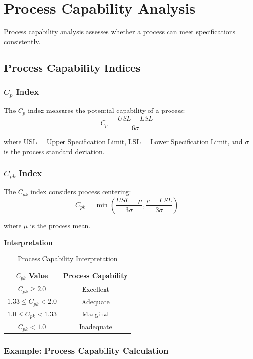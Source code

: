 \documentclass[twoside]{book}
\begin{document}
\section{Process Capability Analysis}

Process capability analysis assesses whether a process can meet specifications consistently.

\subsection{Process Capability Indices}

\subsubsection{$C_p$ Index}

The $C_p$ index measures the potential capability of a process:
$$C_p = \frac{USL - LSL}{6\sigma}$$

where USL = Upper Specification Limit, LSL = Lower Specification Limit, and $\sigma$ is the process standard deviation.

\subsubsection{$C_{pk}$ Index}

The $C_{pk}$ index considers process centering:
$$C_{pk} = \min\left(\frac{USL - \mu}{3\sigma}, \frac{\mu - LSL}{3\sigma}\right)$$

where $\mu$ is the process mean.

\textbf{Interpretation}

\begin{table}[H]
\centering
\caption{Process Capability Interpretation}
\begin{tabular}{cc}
\toprule
$C_{pk}$ Value & Process Capability \\
\midrule
$C_{pk} \geq 2.0$ & Excellent \\
$1.33 \leq C_{pk} < 2.0$ & Adequate \\
$1.0 \leq C_{pk} < 1.33$ & Marginal \\
$C_{pk} < 1.0$ & Inadequate \\
\bottomrule
\end{tabular}
\end{table}

\subsubsection{Example: Process Capability Calculation}
\end{document}
